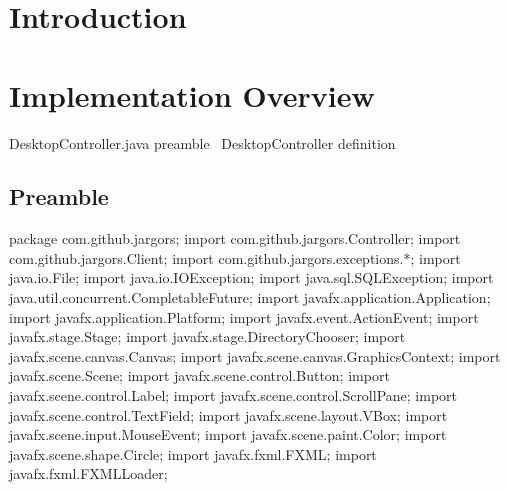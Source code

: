 \section{Introduction}
\label{sec:introduction}

\section{Implementation Overview}
\endmoddef{}
\LA{}DesktopController.java preamble~{\nwtagstyle{}}\RA{}
\LA{}\code{}DesktopController\edoc{} definition~{\nwtagstyle{}}\RA{}
\nwendcode{}\nwdocspar

\subsection{Preamble}
\nwenddocs{}\endmoddef{}
package com.github.jargors;
import com.github.jargors.Controller;
import com.github.jargors.Client;
import com.github.jargors.exceptions.*;
\nwendcode{}\nwdocspar
\nwenddocs{}\plusendmoddef
import java.io.File;
import java.io.IOException;
import java.sql.SQLException;
import java.util.concurrent.CompletableFuture;
\nwendcode{}\nwdocspar
\nwenddocs{}\plusendmoddef
import javafx.application.Application;
import javafx.application.Platform;
import javafx.event.ActionEvent;
import javafx.stage.Stage;
import javafx.stage.DirectoryChooser;
import javafx.scene.canvas.Canvas;
import javafx.scene.canvas.GraphicsContext;
import javafx.scene.Scene;
import javafx.scene.control.Button;
import javafx.scene.control.Label;
import javafx.scene.control.ScrollPane;
import javafx.scene.control.TextField;
import javafx.scene.layout.VBox;
import javafx.scene.input.MouseEvent;
import javafx.scene.paint.Color;
import javafx.scene.shape.Circle;
import javafx.fxml.FXML;
import javafx.fxml.FXMLLoader;
\nwendcode{}\nwdocspar

